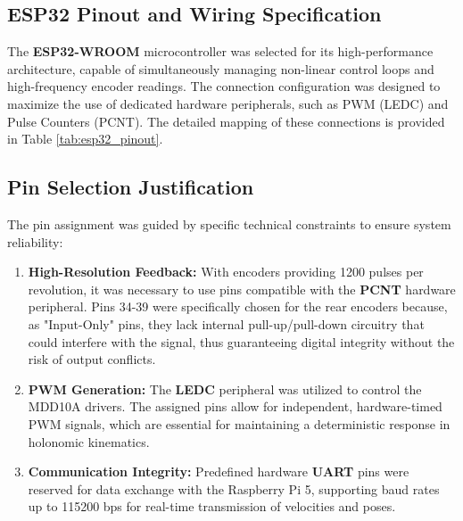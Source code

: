 \subsection{ESP32 Pinout and Wiring Specification}

The \textbf{ESP32-WROOM} microcontroller was selected for its high-performance architecture, capable of simultaneously managing non-linear control loops and high-frequency encoder readings. The connection configuration was designed to maximize the use of dedicated hardware peripherals, such as PWM (LEDC) and Pulse Counters (PCNT). The detailed mapping of these connections is provided in Table \ref{tab:esp32_pinout}.

\subsection{Pin Selection Justification}

The pin assignment was guided by specific technical constraints to ensure system reliability:

\begin{enumerate}
    \item \textbf{High-Resolution Feedback:} With encoders providing 1200 pulses per revolution, it was necessary to use pins compatible with the \textbf{PCNT} hardware peripheral. Pins 34-39 were specifically chosen for the rear encoders because, as "Input-Only" pins, they lack internal pull-up/pull-down circuitry that could interfere with the signal, thus guaranteeing digital integrity without the risk of output conflicts.
    \item \textbf{PWM Generation:} The \textbf{LEDC} peripheral was utilized to control the MDD10A drivers. The assigned pins allow for independent, hardware-timed PWM signals, which are essential for maintaining a deterministic response in holonomic kinematics.
    \item \textbf{Communication Integrity:} Predefined hardware \textbf{UART} pins were reserved for data exchange with the Raspberry Pi 5, supporting baud rates up to 115200 bps for real-time transmission of velocities and poses.
\end{enumerate}

